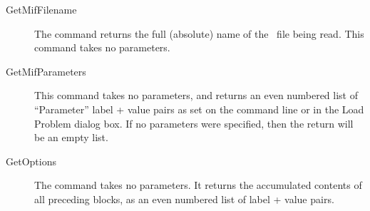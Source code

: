 \begin{description}
\item[GetMifFilename\label{html:mif2GetMifFilename}]
The  command returns the full (absolute) name of the
\MIF\ file being read.  This command takes no parameters.

\item[GetMifParameters\label{html:mif2GetMifParameters}]
This command takes no parameters, and returns an even numbered list of
``Parameter'' label + value pairs as set on the command line or in the
Load Problem dialog box.  If no parameters were specified, then the return
will be an empty list.

\item[GetOptions\label{html:mif2GetOptions}]
The  command takes no parameters.  It returns the
accumulated contents of all preceding  blocks, as an even
numbered list of label + value pairs.


\end{description}
